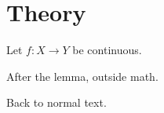 \section{Theory}
Let $f\colon X \to Y$ be continuous.

After the lemma, \alpha outside math.

Back to normal text.
